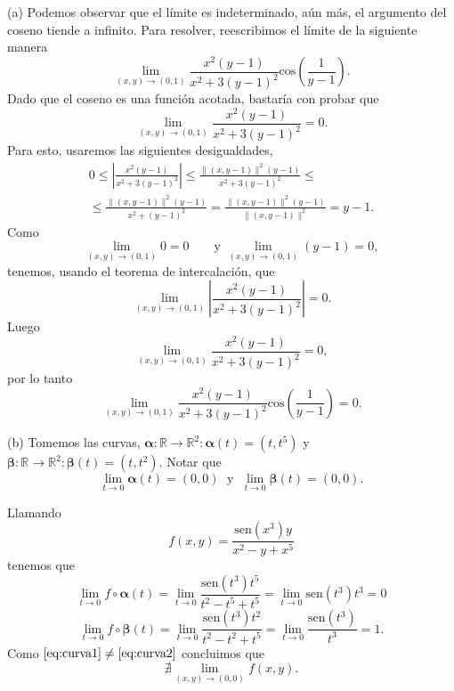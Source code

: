 \begin{solution}
    (a) Podemos observar que el límite es indeterminado, aún más, el argumento del coseno tiende a infinito. Para resolver, reescribimos el límite de la siguiente manera
    \[
    \lim_{(x,y)\to(0,1)} \frac{x^2(y-1)}{x^2+3(y-1)^2}\text{cos}(\frac{1}{y-1}).
    \]
 Dado que el coseno es una función acotada,  bastaría con probar que $$ \lim_{(x,y)\to(0,1)} \frac{x^2(y-1)}{x^2+3(y-1)^2}=0.$$  
 Para esto, usaremos las siguientes desigualdades,  
    \begin{gather*}
        0 \leq \left|\frac{x^2(y-1)}{x^2+3(y-1)^2}\right| \leq \frac{\|(x,y-1)\|^2(y-1)}{x^2+3(y-1)^2}\leq\\[.2cm]
        \leq    
        \frac{\|(x,y-1)\|^2(y-1)}{x^2+(y-1)^2} = \frac{\|(x,y-1)\|^2(y-1)}{\|(x,y-1)\|^2} = y-1.
    \end{gather*} 
Como  $$\lim_{(x,y)\to(0,1)} 0 = 0 \;\;\;\;\;\;\mbox{ y } \lim_{(x,y)\to(0,1)} (y-1) = 0, $$
   tenemos, usando el teorema de intercalaci\'on, que 
    $$ \lim_{(x,y)\to(0,1)} \left|\frac{x^2(y-1)}{x^2+3(y-1)^2}\right| = 0.$$
    Luego  $$ \lim_{(x,y)\to(0,1)} \frac{x^2(y-1)}{x^2+3(y-1)^2}=0,$$ por lo tanto $$\lim_{(x,y)\to(0,1)} \frac{x^2(y-1)}{x^2+3(y-1)^2}\text{cos}(\frac{1}{y-1}) = 0.$$
    

    (b) Tomemos  las curvas,  $\boldsymbol{\alpha}:\mathbb{R}\to\mathbb{R}^2:  \boldsymbol{\alpha}(t)=(t,t^5)$  \; y \;  $\boldsymbol{\beta}:\mathbb{R}\to\mathbb{R}^2: \boldsymbol{\beta}(t)=(t,t^2)$. Notar que $$\lim_{t\to0}\boldsymbol{\alpha}(t)=(0,0)  \; \mbox{ y } \;   \lim_{t\to0}\boldsymbol{\beta}(t)=(0,0).$$   
    
  Llamando  $$f(x,y) = \frac{\text{sen}(x^3)y}{x^2-y+x^5}$$ tenemos que
    \begin{equation}    
        \lim_{t\to0}f\circ\boldsymbol{\alpha}(t) = \lim_{t\to0}\frac{\text{sen}(t^3)t^5}{t^2-t^5+t^5} = \lim_{t\to0}\text{sen}(t^3)t^3 = 0 \label{eq:curva1}
    \end{equation}
    \begin{equation}
        \lim_{t\to0}f\circ\boldsymbol{\beta}(t) = \lim_{t\to0}\frac{\text{sen}(t^3)t^2}{t^2-t^2+t^5} = \lim_{t\to0}\frac{\text{sen}(t^3)}{t^3} = 1. \label{eq:curva2}
    \end{equation}
    Como \; $\eqref{eq:curva1} \neq \eqref{eq:curva2}$ 
    concluimos  que $$ \nexists\lim_{(x,y)\to(0,0)}
    f(x,y).$$
\end{solution}


